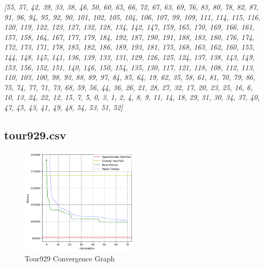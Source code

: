 \documentclass[a4paper,10pt]{article}
\newcommand{\ReplaceMe}[1]{{\color{blue}#1}}
\begin{document}
\begin{center}
\textit{[55, 57, 42, 39, 33, 38, 46, 50, 60, 65, 66, 72, 67, 63, 69, 76, 83, 80, 78, 82, 87, 91, 96, 94, 95, 92, 90, 101, 102, 105, 104, 106, 107, 99, 109, 111, 114, 115, 116, 120, 119, 122, 123, 127, 132, 128, 134, 142, 147, 159, 165, 170, 169, 166, 161, 157, 158, 164, 167, 177, 179, 184, 192, 187, 190, 191, 188, 183, 180, 176, 174, 172, 173, 171, 178, 185, 182, 186, 189, 193, 181, 175, 168, 163, 162, 160, 155, 144, 148, 145, 141, 136, 139, 133, 131, 129, 126, 125, 124, 137, 138, 143, 149, 153, 156, 152, 151, 140, 146, 150, 154, 135, 130, 117, 121, 118, 108, 112, 113, 110, 103, 100, 98, 93, 88, 89, 97, 84, 85, 64, 19, 62, 35, 58, 61, 81, 70, 79, 86, 75, 74, 77, 71, 73, 68, 59, 56, 44, 36, 26, 21, 28, 27, 32, 17, 20, 23, 25, 16, 6, 10, 13, 24, 22, 12, 15, 7, 5, 0, 3, 1, 2, 4, 8, 9, 11, 14, 18, 29, 31, 30, 34, 37, 40, 47, 45, 43, 41, 49, 48, 54, 53, 51, 52]}
\end{center}

\subsection{tour929.csv} \label{ss:tour929}

%
%
%

\begin{figure}[H]
    \centering
	\includegraphics[width=0.5\textwidth]{results/4.5/tour929_convergence.png}
    \caption{Tour929 Convergence Graph}
    \label{fig:tour929convergence}
\end{figure}
\end{document}
